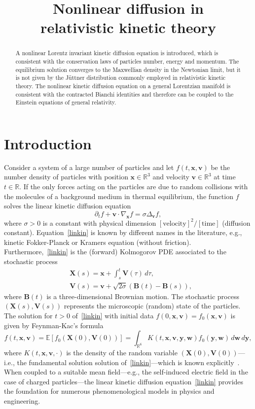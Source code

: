 \documentclass[12pt]{article}
\title{\Huge{Nonlinear diffusion in\\ relativistic kinetic theory}} \author
\date{}
\newcommand{\R}{\mathbb{R}}
\theoremstyle{definition}
\numberwithin{equation}{section}
\begin{document}
\maketitle
\begin{abstract}
A nonlinear Lorentz invariant kinetic diffusion equation is introduced, which is consistent with the conservation laws of particles number, energy and momentum. The equilibrium solution converges to the Maxwellian density in the Newtonian limit, but it is not given by the Jüttner distribution commonly employed in relativistic kinetic theory. 
The nonlinear kinetic diffusion equation on a general Lorentzian manifold is consistent with the contracted Bianchi identities and therefore can be coupled to the Einstein equations of general relativity.
\end{abstract}
\section{Introduction}
Consider a system of a large number of particles and let $f(t,{\bm x},{\bm v})$ be the number density of particles with position ${\bm x}\in\R^3$ and velocity ${\bm v}\in\R^3$ at time $t\in\R$. If the only forces acting on the particles are due to random collisions with the molecules of a background medium in thermal equilibrium, the function $f$ solves the linear kinetic diffusion equation
\begin{equation}\label{linkin}
\partial_t f+{\bm v}\cdot\nabla_{\bm x} f=\sigma\Delta_{\bm v} f,
\end{equation}
where $\sigma>0$ is a constant with physical  dimension $[\mathrm{velocity}]^2/[\mathrm{time}]$ (diffusion constant).  Equation~\eqref{linkin} is known by different names in the literature, e.g., kinetic Fokker-Planck or Kramers equation (without friction). 
Furthermore,~\eqref{linkin} is the (forward) Kolmogorov PDE associated to the stochastic process 
\begin{align*}
&{\bm X}(s)={\bm x}+\int_s^t {\bm V}(\tau)\,d\tau,\\
 &{\bm V}(s)={\bm v}+\sqrt{2\sigma}({\bm B}(t)-{\bm B}(s)),
\end{align*}
where ${\bm B}(t)$ is a three-dimensional Brownian motion.
The stochastic process $({\bm X}(s), {\bm V}(s))$ represents the microscopic (random) state of the particles. 
The solution for $t>0$ of~\eqref{linkin} with initial data $f(0,{\bm x}, {\bm v})=f_0({\bm x}, {\bm v})$ is given by Feynman-Kac's formula
\[
f(t,{\bm x},{\bm v})=\mathbb{E}[f_0({\bm X}(0),{\bm V}(0))]=\int_{\R^6}K(t,{\bm x},{\bm v},{\bm y}, {\bm w})f_0({\bm y}, {\bm w})\,d{\bm w}\,d{\bm y},
\]
where $K(t,{\bm x},{\bm v},\cdot)$ is the density of the random variable $({\bm X}(0),{\bm V}(0))$---i.e., the fundamental solution solution of~\eqref{linkin}---which is known explicitly~\cite{Ch}.
When coupled to a suitable mean field---e.g., the self-induced electric field in the case of charged particles---the linear kinetic diffusion equation~\eqref{linkin} provides the foundation for numerous phenomenological models in physics and engineering.
\end{document}

